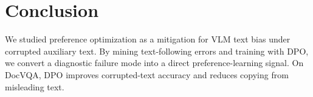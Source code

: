 \section{Conclusion}

We studied preference optimization as a mitigation for VLM text bias under corrupted auxiliary text.
By mining text-following errors and training with DPO, we convert a diagnostic failure mode into a direct preference-learning signal.
On DocVQA, DPO improves corrupted-text accuracy and reduces copying from misleading text.
